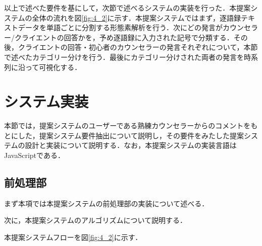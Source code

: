 \documentclass[shuuron]{kuee}
\begin{document}
以上で述べた要件を基にして，次節で述べるシステムの実装を行った．本提案システムの全体の流れを図\ref{fig:4_2}に示す．本提案システムではまず，逐語録テキストデータを単語ごとに分割する形態素解析を行う．次にどの発言がカウンセラー/クライエントの回答かを，予め逐語録に入力された記号で分類する．その後，クライエントの回答・初心者のカウンセラーの発言それぞれについて，本節で述べたカテゴリー分けを行う．最後にカテゴリー分けされた両者の発言を時系列に沿って可視化する．

\section{システム実装}

本節では，提案システムのユーザーである熟練カウンセラーからのコメントをもとにした，提案システム要件抽出について説明し，その要件をみたした提案システムの設計と実装について説明する．なお，本提案システムの実装言語はJavaScriptである．




\subsection{前処理部}

まず本項では本提案システムの前処理部の実装について述べる．




次に，本提案システムのアルゴリズムについて説明する．

本提案システムフローを図\ref{fig:4_2}に示す．
\end{document}
